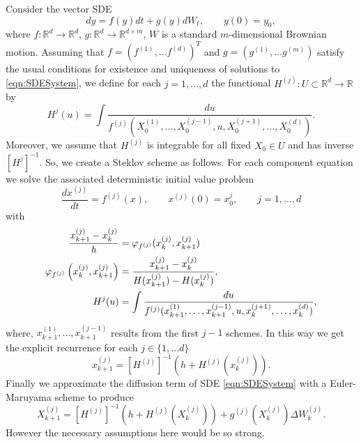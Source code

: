 Consider the vector SDE
\begin{equation}\label{eqn:SDESystem}
	dy = f(y)dt + g(y)dW_t, \qquad y(0) = y_0,
\end{equation}
where $f:\mathbb{R}^d \to \mathbb{R}^d$, $g:\mathbb{R}^d \to \mathbb{R}^{d \times m}$, 
$W$ is a standard $m$-dimensional Brownian motion.
Assuming that $f =(f^{(1)},\dots f^{(d)})^T$ and $g = (g^{(1)}, \dots g^{(m)}) $ satisfy
the usual conditions for existence and uniqueness of solutions to \eqref{eqn:SDESystem}, 
we define for each $j =1,\dots, d$ the functional
$H^{(j)}: U\subset \mathbb{R}^d \to \mathbb{R}$ by
\begin{equation*}
	H^j(u) = \int \frac{du}{
		f^{(j)}(X^{(1)}_{0}, \dots, X^{(j-1)}_{0}, u, X^{{(j+1)}}_{0}, \dots,  X^{(d)}_{0})
	}.
\end{equation*}
Moreover, we assume that $H^{(j)}$ is integrable for all fixed $X_0 \in U$ and has inverse $[H^j]^{-1}$. 
So, we create a  Steklov scheme as follows.
For each component equation we solve the associated deterministic initial value problem
$$
	\frac{dx^{(j)}}{dt} = f^{(j)}(x), \qquad x^{(j)}(0)= x_0^j, \qquad j = 1, \dots, d
$$
with
\begin{align}\label{eqn:SteklovSchem1}
	\frac{x^{(j)}_{k+1} - x^{(j)}_{k} }{h}	&= \varphi_{f^{(j)}}(x^{(j)}_{k}, x^{(j)}_{k+1}) \notag \\
	\varphi_{f^{(j)}} \left(x^{(j)}_{k}, x^{(j)}_{k+1} \right) &= 
		\frac{x^{(j)}_{k+1} - x^{(j)}_{k} }{H(x^{(j)}_{k+1}) -H(x^{(j)}_{k})},	\\
		H^j(u) &= 
			\int 
				\frac{du}{
					f^{(j)}(x^{(1)}_{k+1}, \dots, x^{(j-1)}_{k+1}, u, x^{(j+1)}_{k}, \dots, x^{(d)}_{k})
				} \notag,
\end{align}
where, $x^{{(1)}}_{k+1}, \dots, x^{{(j-1)}}_{k+1}$ results from the first
$j-1$ schemes. In this way we get the explicit recurrence for each $j\in \{ 1,\dots d\}$
\begin{equation*}
	x_{k+1}^{(j)} = 
		[H^{(j)}]^{-1}
		\left(
			h + H^{(j)}\left(x_k^{(j)}\right)
		\right).
\end{equation*}
Finally we approximate the diffusion term of SDE \eqref{eqn:SDESystem} with a Euler-Maruyama scheme to produce
\begin{equation}\label{eqn:SteklovRecurrence}
	X_{k+1}^{(j)} = 
		[H^{(j)}]^{-1}
		\left(
			h + H^{(j)}
			\left(
				X_k^{(j)}
			\right)
		\right)
	+ g^{(j)} \left(X_k^{(j)} \right) \Delta W_k^{(j)}.
\end{equation}
However the necessary assumptions here would be so strong.
